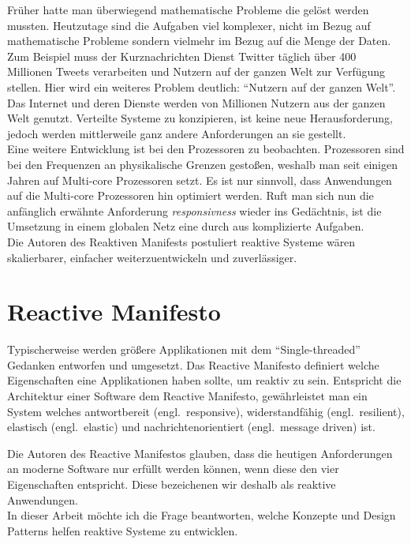 Früher hatte man überwiegend mathematische Probleme die gelöst werden mussten. Heutzutage sind die Aufgaben viel komplexer, nicht im Bezug auf mathematische Probleme sondern vielmehr im Bezug auf die Menge der Daten. Zum Beispiel muss der Kurznachrichten Dienst Twitter täglich über 400 Millionen Tweets verarbeiten und Nutzern auf der ganzen Welt zur Verfügung stellen. Hier wird ein weiteres Problem deutlich: \enquote{Nutzern auf der ganzen Welt}. Das Internet und deren Dienste werden von Millionen Nutzern aus der ganzen Welt genutzt. Verteilte Systeme zu konzipieren, ist keine neue Herausforderung, jedoch werden mittlerweile ganz andere Anforderungen an sie gestellt.\\
Eine weitere Entwicklung ist bei den Prozessoren zu beobachten. Prozessoren sind bei den Frequenzen an physikalische Grenzen gestoßen, weshalb man seit einigen Jahren auf Multi-core Prozessoren setzt. Es ist nur sinnvoll, dass Anwendungen auf die Multi-core Prozessoren hin optimiert werden. Ruft man sich nun die anfänglich erwähnte Anforderung \textit{responsivness} wieder ins Gedächtnis, ist die Umsetzung in einem globalen Netz eine durch aus komplizierte Aufgaben.~\cite[S. 15]{butcher_seven_2014}\\
Die Autoren des Reaktiven Manifests postuliert reaktive Systeme wären skalierbarer, einfacher weiterzuentwickeln und zuverlässiger.~\cite{boner_reactive_2014}

\section{Reactive Manifesto}

Typischerweise werden größere Applikationen mit dem \enquote{Single-threaded} Gedanken entworfen und umgesetzt. Das Reactive Manifesto definiert welche Eigenschaften eine Applikationen haben sollte, um reaktiv zu sein. Entspricht die Architektur einer Software dem Reactive Manifesto, gewährleistet man ein System welches antwortbereit (engl.\ responsive), widerstandfähig (engl.\ resilient), elastisch (engl.\ elastic) und nachrichtenorientiert (engl.\ message driven) ist.~\citetext{\cite[S. 5]{vernon_reactive_2016}, \cite{boner_reactive_2014}}

Die Autoren des Reactive Manifestos glauben, dass die heutigen Anforderungen an moderne Software nur erfüllt werden können, wenn diese den vier Eigenschaften entspricht. Diese bezeichenen wir deshalb als reaktive Anwendungen.~\cite{boner_reactive_2014}\\
In dieser Arbeit möchte ich die Frage beantworten, welche Konzepte und Design Patterns helfen reaktive Systeme zu entwicklen.
